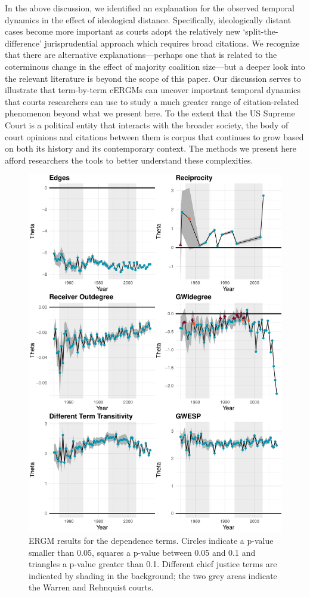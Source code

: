 \documentclass{cup-pan}
\begin{document}
In the above discussion, we identified an explanation for the observed temporal dynamics in the effect of ideological distance. Specifically, ideologically distant cases become more important as courts adopt the relatively new `split-the-difference' jurisprudential approach which requires broad citations. We recognize that there are alternative explanations---perhaps one that is related to the coterminous change in the effect of majority coalition size---but a deeper look into the relevant literature is beyond the scope of this paper. Our discussion serves to illustrate that term-by-term cERGMs can uncover important temporal dynamics that courts researchers can use to study a much greater range of citation-related phenomenon beyond what we present here. To the extent that the US Supreme Court is a political entity that interacts with the broader society, the body of court opinions and citations between them is corpus that continues to grow based on both its history and its contemporary context. The methods we present here afford researchers the tools to better understand these complexities.

\begin{figure}
\centering
\includegraphics[width=14cm ]{SCC_results_1.pdf}
\caption{ERGM results for the dependence terms. Circles indicate a p-value smaller than 0.05, squares a p-value between 0.05 and 0.1 and triangles a p-value greater than 0.1. Different chief justice terms are indicated by shading in the background; the two grey areas indicate the Warren and Rehnquist courts.}
 \label{SCC_results_1}
\end{figure}
\end{document}
